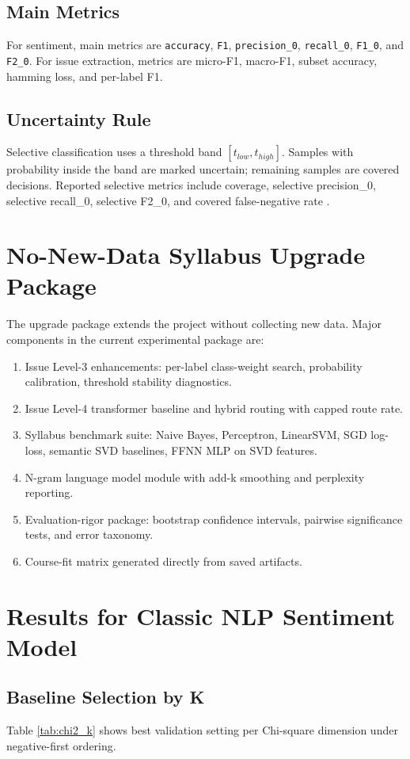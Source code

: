 \documentclass[12pt,a4paper]{article}
\begin{document}
\subsection{Main Metrics}
For sentiment, main metrics are \texttt{accuracy}, \texttt{F1}, \texttt{precision\_0}, \texttt{recall\_0}, \texttt{F1\_0}, and \texttt{F2\_0}. For issue extraction, metrics are micro-F1, macro-F1, subset accuracy, hamming loss, and per-label F1.

\subsection{Uncertainty Rule}
Selective classification uses a threshold band \([t_{low}, t_{high}]\). Samples with probability inside the band are marked uncertain; remaining samples are covered decisions. Reported selective metrics include coverage, selective precision\_0, selective recall\_0, selective F2\_0, and covered false-negative rate \cite{geifman2017}.

\section{No-New-Data Syllabus Upgrade Package}
The upgrade package extends the project without collecting new data. Major components in the current experimental package are:
\begin{enumerate}
\item Issue Level-3 enhancements: per-label class-weight search, probability calibration, threshold stability diagnostics.
\item Issue Level-4 transformer baseline and hybrid routing with capped route rate.
\item Syllabus benchmark suite: Naive Bayes, Perceptron, LinearSVM, SGD log-loss, semantic SVD baselines, FFNN MLP on SVD features.
\item N-gram language model module with add-k smoothing and perplexity reporting.
\item Evaluation-rigor package: bootstrap confidence intervals, pairwise significance tests, and error taxonomy.
\item Course-fit matrix generated directly from saved artifacts.
\end{enumerate}

\section{Results for Classic NLP Sentiment Model}
\subsection{Baseline Selection by K}
Table \ref{tab:chi2_k} shows best validation setting per Chi-square dimension under negative-first ordering.
\end{document}
